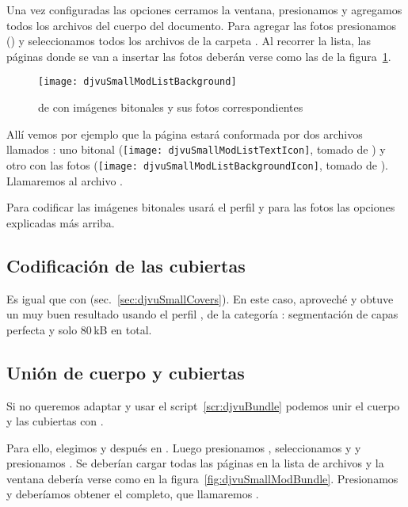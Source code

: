 \documentclass[%
	a5paper,
	10pt,
	twoside,
	openright,
	final,
]{memoir}
\begin{document}
{	Una vez configuradas las opciones cerramos la ventana, presionamos  y agregamos todos los archivos del cuerpo del documento. Para agregar las fotos presionamos \keys{{+}} () y seleccionamos todos los archivos de la carpeta . Al recorrer la lista, las páginas donde se van a insertar las fotos deberán verse como las de la figura~\ref{fig:djvuSmallModListBackground}.

	\begin{figure}
		\texttt{[image: djvuSmallModListBackground]}
		\caption[Input file(s) de \djvusmallmod]{ de \djvusmallmod con imágenes bitonales y sus fotos correspondientes\label{fig:djvuSmallModListBackground}}
	\end{figure}

	Allí vemos por ejemplo que la página \menu{[0014]} estará conformada por dos archivos llamados : uno bitonal  (\texttt{[image: djvuSmallModListTextIcon]}, tomado de ) y otro con las fotos (\texttt{[image: djvuSmallModListBackgroundIcon]}, tomado de ). Llamaremos al archivo .

	Para codificar las imágenes bitonales \djvusmallmod usará el perfil  y para las fotos las opciones explicadas más arriba.

	\subsection{Codificación de las cubiertas} Es igual que con \djvusmall (sec.~\ref{sec:djvuSmallCovers}). En este caso, aproveché y obtuve un muy buen resultado usando el perfil , de la categoría : segmentación de capas perfecta y solo 80\,kB en total.

	\subsection{Unión de cuerpo y cubiertas} Si no queremos adaptar y usar el script~\ref{scr:djvuBundle} podemos unir el cuerpo y las cubiertas con \djvusmallmod.

	Para ello, elegimos  y después en . Luego presionamos , seleccionamos  y  y presionamos . Se deberían cargar todas las páginas en la lista de archivos y la ventana debería verse como en la figura~\ref{fig:djvuSmallModBundle}. Presionamos  y deberíamos obtener el \djvu completo, que llamaremos .

}
\end{document}
